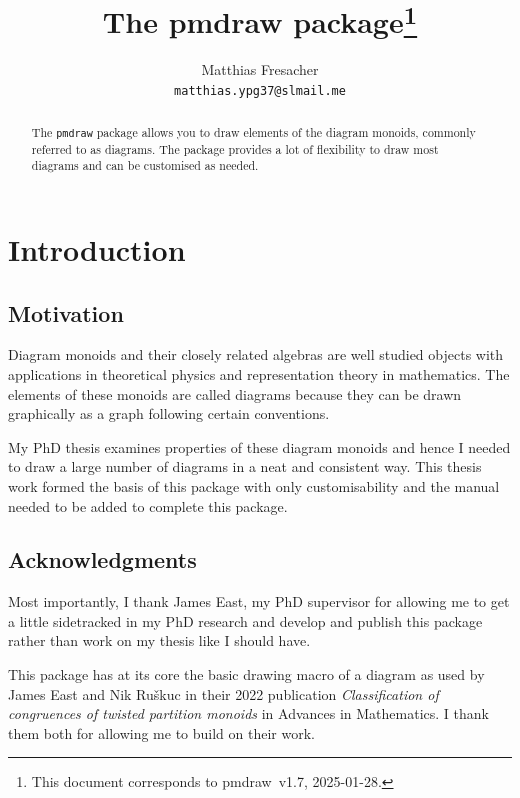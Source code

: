 \documentclass{ltxdoc}
\begin{document}
\hypersetup{colorlinks, linkcolor=blue, urlcolor=blue}

\title{The \textsf{pmdraw} package\thanks{This document
  corresponds to \textsf{pmdraw}~v1.7, 2025-01-28.}}
\author{Matthias Fresacher \\ \texttt{matthias.ypg37@slmail.me}}

\maketitle

\begin{abstract}
The \texttt{pmdraw} package allows you to draw elements of the diagram monoids, commonly referred to as diagrams. The package provides a lot of flexibility to draw most diagrams and can be customised as needed.
\end{abstract}

\tableofcontents

\newpage
\section{Introduction}

\subsection{Motivation}

Diagram monoids and their closely related algebras are well studied objects with applications in theoretical physics and representation theory in mathematics. The elements of these monoids are called diagrams because they can be drawn graphically as a graph following certain conventions.

My PhD thesis examines properties of these diagram monoids and hence I needed to draw a large number of diagrams in a neat and consistent way. This thesis work formed the basis of this package with only customisability and the manual needed to be added to complete this package.

\subsection{Acknowledgments}

Most importantly, I thank James East, my PhD supervisor for allowing me to get a little sidetracked in my PhD research and develop and publish this package rather than work on my thesis like I should have.

This package has at its core the basic drawing macro of a diagram as used by James East and Nik Ru\v{s}kuc in their 2022 publication {\it Classification of congruences of twisted partition monoids} in Advances in Mathematics. I thank them both for allowing me to build on their work.
\end{document}
